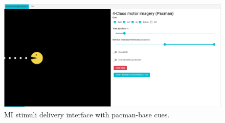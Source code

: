 \begin{figure}[H]
\begin{centering}
% 
\includegraphics[width=1\textwidth]{Appendix/databases/Figures/mi-delivery-pacman.png}
\par\end{centering}
\caption{\gls*{MI} stimuli delivery interface with pacman-base cues.}
\label{}
\end{figure}